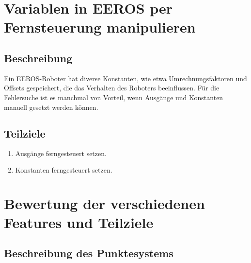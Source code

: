 \section{Variablen in EEROS per Fernsteuerung manipulieren}
\subsection{Beschreibung}
Ein EEROS-Roboter hat diverse Konstanten, wie etwa Umrechnungsfaktoren und Offsets gespeichert, die das Verhalten des Roboters beeinflussen.
Für die Fehlersuche ist es manchmal von Vorteil, wenn Ausgänge und Konstanten manuell gesetzt werden können.

\subsection{Teilziele}
\begin{enumerate}
\item Ausgänge ferngesteuert setzen.
\item Konstanten ferngesteuert setzen.
\end{enumerate}


\section{Bewertung der verschiedenen Features und Teilziele}
\subsection{Beschreibung des Punktesystems}

